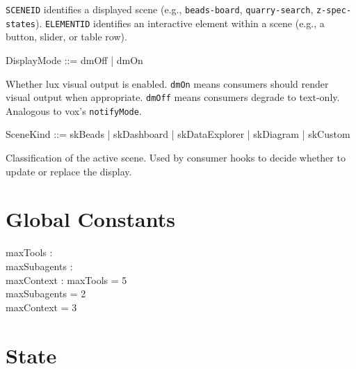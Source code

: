 \documentclass[a4paper,10pt,fleqn]{article}
\begin{document}
\texttt{SCENEID} identifies a displayed scene (e.g.,
\texttt{beads-board}, \texttt{quarry-search}, \texttt{z-spec-states}).
\texttt{ELEMENTID} identifies an interactive element within a scene
(e.g., a button, slider, or table row).

\begin{zed}
  DisplayMode ::= dmOff | dmOn
\end{zed}

Whether lux visual output is enabled. \texttt{dmOn} means consumers
should render visual output when appropriate. \texttt{dmOff} means
consumers degrade to text-only. Analogous to vox's
\texttt{notifyMode}.

\begin{zed}
  SceneKind ::= skBeads | skDashboard | skDataExplorer | skDiagram | skCustom
\end{zed}

Classification of the active scene. Used by consumer hooks to decide
whether to update or replace the display.

\section{Global Constants}

\begin{axdef}
  maxTools : \nat \\
  maxSubagents : \nat \\
  maxContext : \nat
  \where
  maxTools = 5 \\
  maxSubagents = 2 \\
  maxContext = 3
\end{axdef}

\section{State}
\end{document}
